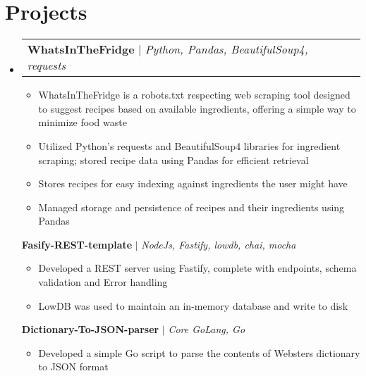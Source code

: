 \documentclass[letterpaper,11pt]{article}
\makeatletter
\newcommand{\resumeItem}[1]{
  \item\small{
    {#1 \vspace{-2pt}}
  }
}
\newcommand{\resumeProjectHeading}[2]{
    \item
    \begin{tabular*}{0.97\textwidth}{l@{\extracolsep{\fill}}r}
      \small#1 & #2 \\
    \end{tabular*}\vspace{-7pt}
}
\newcommand{\resumeSubHeadingListStart}{\begin{itemize}[leftmargin=0.15in, label={}]}
\newcommand{\resumeSubHeadingListEnd}{\end{itemize}}
\newcommand{\resumeItemListStart}{\begin{itemize}\vspace{0pt}}
\newcommand{\resumeItemListEnd}{\end{itemize}\vspace{0pt}}
\makeatother
\begin{document}
\section{Projects}
    \resumeSubHeadingListStart
      \resumeProjectHeading
        {\textbf{WhatsInTheFridge{\vspace{5pt}}} $|$ \emph{Python, Pandas, BeautifulSoup4, requests}}{}
          \resumeItemListStart
          \resumeItem{WhatsInTheFridge is a robots.txt respecting web scraping tool designed to suggest recipes based on available ingredients, offering a simple way to minimize food waste}
            \resumeItem{Utilized Python's requests and BeautifulSoup4 libraries for ingredient scraping; stored recipe data using Pandas for efficient retrieval}
            \resumeItem{Stores recipes for easy indexing against ingredients the user might have}
            \resumeItem{Managed storage and persistence of recipes and their ingredients using Pandas}
          \resumeItemListEnd
        {\textbf{Fasify-REST-template} $|$ \emph{NodeJs, Fastify, lowdb, chai, mocha}}{}
          \resumeItemListStart
            \resumeItem{Developed a REST server using Fastify, complete with endpoints, schema validation and Error handling}
            \resumeItem{LowDB was used to maintain an in-memory database and write to disk}
          \resumeItemListEnd
        {\textbf{Dictionary-To-JSON-parser} $|$ \emph{Core GoLang, Go}}{}
          \resumeItemListStart
            \resumeItem{Developed a simple Go script to parse the contents of Websters dictionary to JSON format}
          \resumeItemListEnd
    \resumeSubHeadingListEnd

\end{document}
